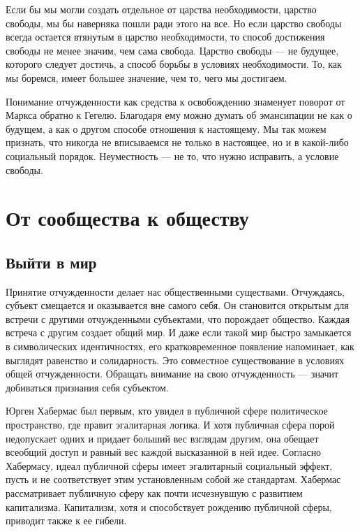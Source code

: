 \documentclass[12pt]{book}
\begin{document}
Если бы мы могли создать отдельное от царства необходимости, царство свободы, мы бы наверняка пошли ради этого на все. Но если царство свободы всегда остается втянутым в царство необходимости, то способ достижения свободы не менее значим, чем сама свобода. Царство свободы --- не будущее, которого следует достичь, а способ борьбы в условиях необходимости. То, как мы боремся, имеет большее значение, чем то, чего мы достигаем.

Понимание отчужденности как средства к освобождению знаменует поворот от Маркса обратно к Гегелю. Благодаря ему можно думать об эмансипации не как о будущем, а как о другом способе отношения к настоящему. Мы так можем признать, что никогда не вписываемся не только в настоящее, но и в какой-либо социальный порядок. Неуместность --- не то, что нужно исправить, а условие свободы.

\chapter{От сообщества к обществу}

\section{Выйти в мир}

Принятие отчужденности делает нас общественными существами. Отчуждаясь, субъект смещается и оказывается вне самого себя. Он становится открытым для встречи с другими отчужденными субъектами, что порождает общество. Каждая встреча с другим создает общий мир. И даже если такой мир быстро замыкается в символических идентичностях, его кратковременное появление напоминает, как выглядят равенство и солидарность. Это совместное существование в условиях общей отчужденности. Обращать внимание на свою отчужденность --- значит добиваться признания себя субъектом.

Юрген Хабермас был первым, кто увидел в публичной сфере политическое пространство, где правит эгалитарная логика. И хотя публичная сфера порой недопускает одних и придает больший вес взглядам другим, она обещает всеобщий доступ и равный вес каждой высказанной в ней идее. Согласно Хабермасу, идеал публичной сферы имеет эгалитарный социальный эффект, пусть и не соответствует этим установленным собой же стандартам. Хабермас рассматривает публичную сферу как почти исчезнувшую с развитием капитализма. Капитализм, хотя и способствует рождению публичной сферы, приводит также к ее гибели.
\end{document}
